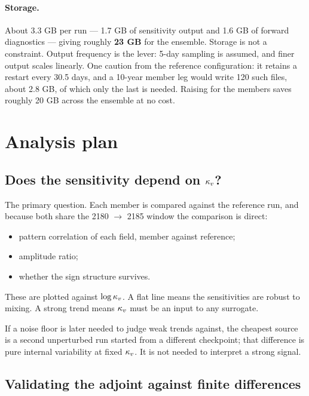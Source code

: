 \paragraph{Storage.}
About 3.3 GB per run --- 1.7 GB of sensitivity output and 1.6 GB of forward
diagnostics --- giving roughly \textbf{23 GB} for the ensemble. Storage is not a
constraint. Output frequency is the lever: 5-day sampling is assumed, and finer
output scales linearly. One caution from the reference configuration: it retains
a restart every 30.5 days, and a 10-year member leg would write 120 such files,
about 2.8 GB, of which only the last is needed. Raising  for the
members saves roughly 20 GB across the ensemble at no cost.

\section{Analysis plan}

\subsection{Does the sensitivity depend on \texorpdfstring{$\kappa_{v}$}{kappa}?}

The primary question. Each member is compared against the reference run, and
because both share the 2180 $\rightarrow$ 2185 window the comparison is direct:

\begin{itemize}[nosep]
  \item pattern correlation of each  field, member against reference;
  \item amplitude ratio;
  \item whether the sign structure survives.
\end{itemize}

These are plotted against $\log\kappa_{v}$. A flat line means the sensitivities are
robust to mixing. A strong trend means $\kappa_{v}$ must be an input to any surrogate.

If a noise floor is later needed to judge weak trends against, the cheapest
source is a second unperturbed run started from a different checkpoint; that
difference is pure internal variability at fixed $\kappa_{v}$. It is not needed to
interpret a strong signal.

\subsection{Validating the adjoint against finite differences}
\label{sec:fd}

